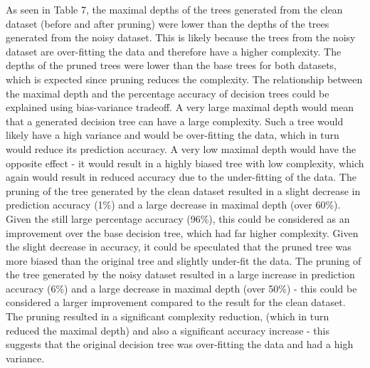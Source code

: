 \documentclass[11pt, a4paper]{article}
\begin{document}
  \noindent
  As seen in Table 7, the maximal depths of the trees generated from the clean dataset
  (before and after pruning) were lower than the depths of the trees generated from the
  noisy dataset. This is likely because the trees from the noisy dataset are over-fitting
  the data and therefore have a higher complexity. The depths of the pruned trees were lower
  than the base trees for both datasets, which is expected since pruning reduces the
  complexity.
  \newline
  \newline
  \noindent
  The relationship between the maximal depth and the percentage accuracy of decision trees
  could be explained using bias-variance tradeoff. A very large maximal depth would mean that
  a generated decision tree can have a large complexity. Such a tree would likely have a high
  variance and would be over-fitting the data, which in turn would reduce its prediction accuracy.
  A very low maximal depth would have the opposite effect - it would result in a highly biased
  tree with low complexity, which again would result in reduced accuracy due to the under-fitting
  of the data.
  \newline
  \newline
  \noindent
  The pruning of the tree generated by the clean dataset resulted in a slight decrease
  in prediction accuracy (1\%) and a large decrease in maximal depth (over 60\%). Given
  the still large percentage accuracy (96\%), this could be considered as an improvement
  over the base decision tree, which had far higher complexity. Given the slight decrease
  in accuracy, it could be speculated that the pruned tree was more biased than the original
  tree and slightly under-fit the data.
  \newline
  \newline
  \noindent
  The pruning of the tree generated by the noisy dataset resulted in a large increase in
  prediction accuracy (6\%) and a large decrease in maximal depth (over 50\%) - this could
  be considered a larger improvement compared to the result for the clean dataset. The
  pruning resulted in a significant complexity reduction, (which in turn reduced the maximal depth)
  and also a significant accuracy increase - this suggests that the original decision tree was
  over-fitting the data and had a high variance.
\end{document}
